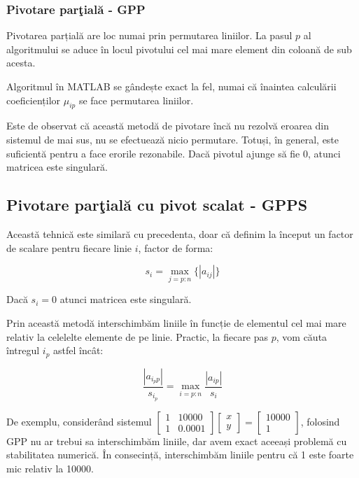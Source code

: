 \documentclass{exam}
\newcommand{\octavescript}[2]{
	
}
\begin{document}
\subsubsection{Pivotare parţială - GPP}

\par Pivotarea parțială are loc numai prin permutarea liniilor. La pasul $p$ al
algoritmului se aduce în locul pivotului cel mai mare element din coloană de sub
acesta.

\par Algoritmul în MATLAB se gândește exact la fel, numai că înaintea calculării
coeficienților $\mu_{ip}$ se face permutarea liniilor.

\octavescript{./src/GPP.m}{}

\par Este de observat că această metodă de pivotare încă nu rezolvă eroarea din
sistemul de mai sus, nu se efectuează nicio permutare. Totuși, în general, este
suficientă pentru a face erorile rezonabile. Dacă pivotul ajunge să fie 0,
atunci matricea este singulară.

\subsection{Pivotare parţială cu pivot scalat - GPPS}

\par Această tehnică este similară cu precedenta, doar că definim la început un
factor de scalare pentru fiecare linie $i$, factor de forma:

\begin{equation*}
	s_i = \max_{j=p:n}{\{|a_{ij}|\}}
\end{equation*}

\par Dacă $s_i = 0$ atunci matricea este singulară.

\par Prin această metodă interschimbăm liniile în funcție de elementul cel mai
mare relativ la celelelte elemente de pe linie. Practic, la fiecare pas $p$,
vom căuta întregul $i_p$ astfel încât:

\begin{equation*}
	\frac{|a_{i_p p}|}{s_{i_p}} = \max_{i=p:n}{\frac{|a_{i p}|}{s_i}}
\end{equation*}

\par De exemplu, considerând sistemul
$\begin{bmatrix}
		1 & 10000  \\
		1 & 0.0001
	\end{bmatrix}
	\begin{bmatrix}
		x \\
		y
	\end{bmatrix}
	=
	\begin{bmatrix}
		10000 \\
		1
	\end{bmatrix}
$, folosind GPP nu ar trebui sa interschimbăm liniile, dar avem exact aceeași
problemă cu stabilitatea numerică. În consecință, interschimbăm liniile pentru
că 1 este foarte mic relativ la 10000.
\end{document}
